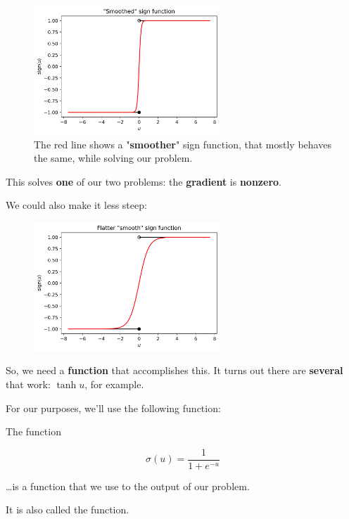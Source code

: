         \begin{figure}[H]
            \centering
            
            \includegraphics[width=70mm,scale=0.5]{images/classification_images/smoothed_sign_function.png}
            \caption*{The red line shows a "\textbf{smoother}" sign function, that mostly behaves the same, while solving our problem.}
        \end{figure}
        
        This solves \textbf{one} of our two problems: the \textbf{gradient} is \textbf{nonzero}. 
        
        We could also make it less steep:
        
        \begin{figure}[H]
            \centering
            
            \includegraphics[width=70mm,scale=0.5]{images/classification_images/flatter_smooth_sign_function.png}
        \end{figure}
        
        So, we need a \textbf{function} that accomplishes this. It turns out there are \textbf{several} that work: $\tanh{u}$, for example.
        
        For our purposes, we'll use the following function:\\
        
        \begin{definition}
            The  function
            
            \begin{equation}
                \sigma(u) = \frac{1}{1+e^{-u}}
            \end{equation}
            
            \ldots is a  function that we use to  the output of our  problem.
            
            It is also called the  function.
        \end{definition}
        
